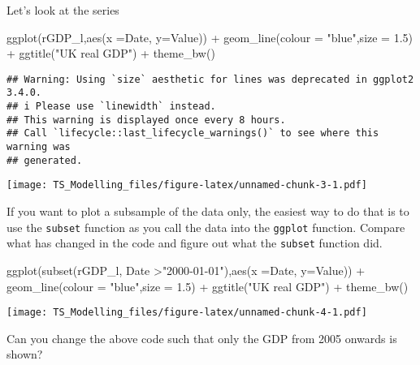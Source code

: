 \documentclass[
]{article}
\newenvironment{Shaded}{\begin{snugshade}}{\end{snugshade}}
\newcommand{\AttributeTok}[1]{\textcolor[rgb]{0.77,0.63,0.00}{#1}}
\newcommand{\FloatTok}[1]{\textcolor[rgb]{0.00,0.00,0.81}{#1}}
\newcommand{\FunctionTok}[1]{\textcolor[rgb]{0.00,0.00,0.00}{#1}}
\newcommand{\NormalTok}[1]{#1}
\newcommand{\SpecialCharTok}[1]{\textcolor[rgb]{0.00,0.00,0.00}{#1}}
\newcommand{\StringTok}[1]{\textcolor[rgb]{0.31,0.60,0.02}{#1}}
\begin{document}
Let's look at the series

\begin{Shaded}
\begin{Highlighting}[]
\FunctionTok{ggplot}\NormalTok{(rGDP\_l,}\FunctionTok{aes}\NormalTok{(}\AttributeTok{x =}\NormalTok{Date, }\AttributeTok{y=}\NormalTok{Value)) }\SpecialCharTok{+} 
  \FunctionTok{geom\_line}\NormalTok{(}\AttributeTok{colour =} \StringTok{"blue"}\NormalTok{,}\AttributeTok{size =} \FloatTok{1.5}\NormalTok{) }\SpecialCharTok{+}
  \FunctionTok{ggtitle}\NormalTok{(}\StringTok{"UK real GDP"}\NormalTok{) }\SpecialCharTok{+}
  \FunctionTok{theme\_bw}\NormalTok{()}
\end{Highlighting}
\end{Shaded}

\begin{verbatim}
## Warning: Using `size` aesthetic for lines was deprecated in ggplot2 3.4.0.
## i Please use `linewidth` instead.
## This warning is displayed once every 8 hours.
## Call `lifecycle::last_lifecycle_warnings()` to see where this warning was
## generated.
\end{verbatim}

\texttt{[image: TS\_Modelling\_files/figure-latex/unnamed-chunk-3-1.pdf]}

If you want to plot a subsample of the data only, the easiest way to do
that is to use the \texttt{subset} function as you call the data into
the \texttt{ggplot} function. Compare what has changed in the code and
figure out what the \texttt{subset} function did.

\begin{Shaded}
\begin{Highlighting}[]
\FunctionTok{ggplot}\NormalTok{(}\FunctionTok{subset}\NormalTok{(rGDP\_l, Date }\SpecialCharTok{\textgreater{}}\StringTok{"2000{-}01{-}01"}\NormalTok{),}\FunctionTok{aes}\NormalTok{(}\AttributeTok{x =}\NormalTok{Date, }\AttributeTok{y=}\NormalTok{Value)) }\SpecialCharTok{+} 
  \FunctionTok{geom\_line}\NormalTok{(}\AttributeTok{colour =} \StringTok{"blue"}\NormalTok{,}\AttributeTok{size =} \FloatTok{1.5}\NormalTok{) }\SpecialCharTok{+}
  \FunctionTok{ggtitle}\NormalTok{(}\StringTok{"UK real GDP"}\NormalTok{) }\SpecialCharTok{+}
  \FunctionTok{theme\_bw}\NormalTok{()}
\end{Highlighting}
\end{Shaded}

\texttt{[image: TS\_Modelling\_files/figure-latex/unnamed-chunk-4-1.pdf]}

Can you change the above code such that only the GDP from 2005 onwards
is shown?
\end{document}
